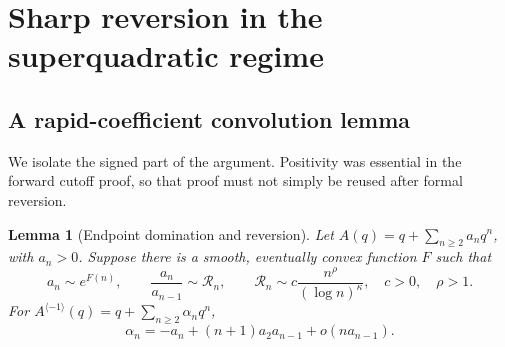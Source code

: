 \documentclass[11pt,a4paper]{article}
\numberwithin{equation}{section}
\newtheorem{lemma}[theorem]{Lemma}
\theoremstyle{definition}
\theoremstyle{remark}
\begin{document}
\section{Sharp reversion in the superquadratic regime}
\label{sec:inverse}

\subsection{A rapid-coefficient convolution lemma}

We isolate the signed part of the argument. Positivity was essential in
the forward cutoff proof, so that proof must not simply be reused after
formal reversion.

\begin{lemma}[Endpoint domination and reversion]
\label{lem:rapid-inverse}
Let $A(q)=q+\sum_{n\ge2}a_nq^n$, with $a_n>0$. Suppose there is a
smooth, eventually convex function $F$ such that
\[
 a_n\sim e^{F(n)},\qquad
 \frac{a_n}{a_{n-1}}\sim\mathcal R_n,
 \qquad
 \mathcal R_n\sim c\frac{n^\rho}{(\log n)^\kappa},
 \quad c>0,\quad\rho>1.
\]
For $A^{\langle-1\rangle}(q)=q+\sum_{n\ge2}\alpha_nq^n$,
\begin{equation}
 \alpha_n=-a_n+(n+1)a_2a_{n-1}+o(na_{n-1}).
 \label{eq:rapid-inverse}
\end{equation}
\end{lemma}
\end{document}
